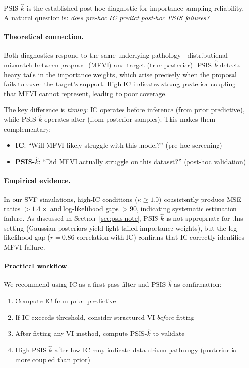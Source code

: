 \documentclass[10pt]{article} %
\theoremstyle{plain}
\theoremstyle{definition}
\begin{document}
PSIS-$\hat{k}$ \citep{vehtari2017practical} is the established post-hoc diagnostic for importance sampling reliability. A natural question is: \emph{does pre-hoc IC predict post-hoc PSIS failures?}

\paragraph{Theoretical connection.} Both diagnostics respond to the same underlying pathology---distributional mismatch between proposal (MFVI) and target (true posterior). PSIS-$\hat{k}$ detects heavy tails in the importance weights, which arise precisely when the proposal fails to cover the target's support. High IC indicates strong posterior coupling that MFVI cannot represent, leading to poor coverage.

The key difference is \emph{timing}: IC operates before inference (from prior predictive), while PSIS-$\hat{k}$ operates after (from posterior samples). This makes them complementary:
\begin{itemize}
    \item \textbf{IC}: ``Will MFVI likely struggle with this model?'' (pre-hoc screening)
    \item \textbf{PSIS-$\hat{k}$}: ``Did MFVI actually struggle on this dataset?'' (post-hoc validation)
\end{itemize}

\paragraph{Empirical evidence.} In our SVF simulations, high-IC conditions ($\kappa \geq 1.0$) consistently produce MSE ratios $> 1.4\times$ and log-likelihood gaps $> 90$, indicating systematic estimation failure. As discussed in Section~\ref{sec:psis-note}, PSIS-$\hat{k}$ is not appropriate for this setting (Gaussian posteriors yield light-tailed importance weights), but the log-likelihood gap ($r = 0.86$ correlation with IC) confirms that IC correctly identifies MFVI failure.

\paragraph{Practical workflow.} We recommend using IC as a first-pass filter and PSIS-$\hat{k}$ as confirmation:
\begin{enumerate}
    \item Compute IC from prior predictive
    \item If IC exceeds threshold, consider structured VI \emph{before} fitting
    \item After fitting any VI method, compute PSIS-$\hat{k}$ to validate
    \item High PSIS-$\hat{k}$ after low IC may indicate data-driven pathology (posterior is more coupled than prior)
\end{enumerate}
\end{document}
